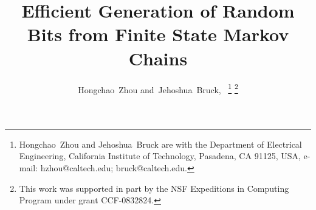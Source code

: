 \documentclass[journal]{IEEEtran}
\begin{document}
%
\title{Efficient Generation of Random Bits from Finite State Markov Chains}



%
%
%

\author{Hongchao~Zhou
        and~Jehoshua~Bruck,~%
\thanks{Hongchao~Zhou and Jehoshua~Bruck are with the Department
of Electrical Engineering, California Institute of Technology, Pasadena,
CA 91125, USA, e-mail: hzhou@caltech.edu; bruck@caltech.edu.}%
\thanks{This work was supported in part by the NSF Expeditions in Computing
Program under grant CCF-0832824.}
}

%
%



%
\end{document}
